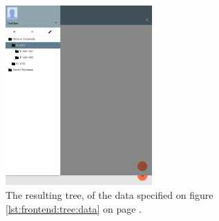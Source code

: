 		\begin{figure}[!htb]
			\centering
			\includegraphics[width=0.5\textwidth,clip,trim=0 690 536 210]{figures/implementation/screenshots/example_tree.png}
			\caption{The resulting tree, of the data specified on figure \ref{lst:frontend:tree:data} on page \pageref{lst:frontend:tree:data}.}
			\label{lst:frontend:tree:result}
		\end{figure}